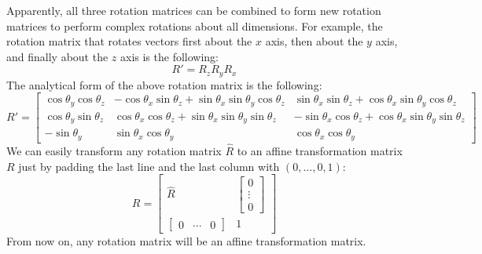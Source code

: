 Apparently, all three rotation matrices can be combined to form new rotation matrices to perform complex rotations about all dimensions. For example, the rotation matrix that rotates vectors first about the $x$ axis, then about the $y$ axis, and finally about the $z$ axis is the following:
\[
	R' = R_zR_yR_x
\]
The analytical form of the above rotation matrix is the following: 
\[
R' = 
\begin{bmatrix}
\cos\theta_y\cos\theta_z & -\cos\theta_x\sin\theta_z + \sin\theta_x\sin\theta_y\cos\theta_z & \sin\theta_x\sin\theta_z + \cos\theta_x\sin\theta_y\cos\theta_z\\

\cos\theta_y\sin\theta_z & \cos\theta_x\cos\theta_z + \sin\theta_x\sin\theta_y\sin\theta_z & -\sin\theta_x\cos\theta_z + \cos\theta_x\sin\theta_y\sin\theta_z\\

-\sin\theta_y & \sin\theta_x\cos\theta_y & \cos\theta_x\cos\theta_y
\end{bmatrix}
\]
We can easily transform any rotation matrix $\widehat{R}$ to an affine transformation matrix $R$ just by padding the last line and the last column with $(0,\ldots,0,1)$: 
\[
R = 
\begin{bmatrix}
\widehat{R} &  \begin{bmatrix} 0\\\vdots\\0 \end{bmatrix}\\
\begin{bmatrix}
0 & \cdots & 0
\end{bmatrix} & 1
\end{bmatrix}
\]
From now on, any rotation matrix will be an affine transformation matrix.


